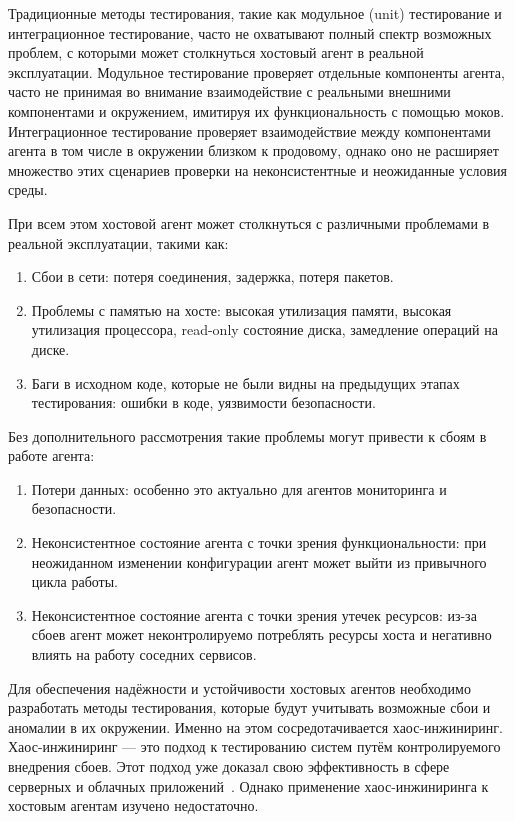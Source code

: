 Традиционные методы тестирования, такие как модульное (unit) тестирование и интеграционное тестирование,
часто не охватывают полный спектр возможных проблем, с которыми может столкнуться хостовый агент в реальной эксплуатации.
Модульное тестирование проверяет отдельные компоненты агента, часто не принимая во внимание взаимодействие с реальными внешними компонентами и окружением,
имитируя их функциональность с помощью моков.
Интеграционное тестирование проверяет взаимодействие между компонентами агента в том числе в окружении близком к продовому,
однако оно не расширяет множество этих сценариев проверки на неконсистентные и неожиданные условия среды.

При всем этом хостовой агент может столкнуться с различными проблемами в реальной эксплуатации, такими как:
\begin{enumerate}
  \item Сбои в сети: потеря соединения, задержка, потеря пакетов.
  \item Проблемы с памятью на хосте: высокая утилизация памяти, высокая утилизация процессора, read-only состояние диска, замедление операций на диске.
  \item Баги в исходном коде, которые не были видны на предыдущих этапах тестирования: ошибки в коде, уязвимости безопасности.
\end{enumerate}

Без дополнительного рассмотрения такие проблемы могут привести к сбоям в работе агента:
\begin{enumerate}
  \item Потери данных: особенно это актуально для агентов мониторинга и безопасности.
  \item Неконсистентное состояние агента с точки зрения функциональности: при неожиданном изменении конфигурации агент может выйти из привычного цикла работы.
  \item Неконсистентное состояние агента с точки зрения утечек ресурсов: из-за сбоев агент может неконтролируемо потреблять ресурсы хоста и негативно влиять на работу соседних сервисов.
\end{enumerate}

Для обеспечения надёжности и устойчивости хостовых агентов необходимо разработать методы тестирования,
которые будут учитывать возможные сбои и аномалии в их окружении.
Именно на этом сосредотачивается хаос-инжиниринг.
Хаос-инжиниринг — это подход к тестированию систем путём контролируемого внедрения сбоев.
Этот подход уже доказал свою эффективность в сфере серверных и облачных приложений~\cite{Basiri2016}.
Однако применение хаос-инжиниринга к хостовым агентам изучено недостаточно.

